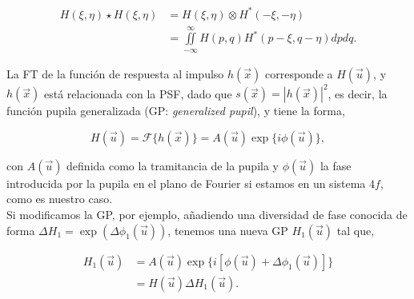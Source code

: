 \begin{equation}
\begin{aligned}
	H(\xi,\eta) \star H(\xi,\eta) &= H(\xi,\eta) \otimes H^{\ast}(-\xi,-\eta) 
	\\&= \iint\limits_{-\infty}^{\infty} H(p,q) H^{\ast}(p-\xi,q-\eta) dp dq.
	\end{aligned}
\end{equation}

La FT de la función de respuesta al impulso $h(\vec{x})$ corresponde a $H(\vec{u})$, y $h(\vec{x})$ está relacionada con la PSF, dado que $s(\vec{x}) = |h(\vec{x})|^2$, es decir, la función pupila generalizada (GP: \textit{generalized pupil}), y tiene la forma,



\begin{equation}
\label{eqD4}
	H(\vec{u}) = \mathscr{F}\{h(\vec{x})\} = A(\vec{u}) \exp\{i \phi(\vec{u})\},
\end{equation}

con $A(\vec{u})$ definida como la tramitancia de la pupila y $\phi(\vec{u})$ la fase introducida por la pupila en el plano de Fourier si estamos en un sistema $4f$, como es nuestro caso.\\ %

Si modificamos la GP, por ejemplo, añadiendo una diversidad de fase conocida de forma $\Delta H_1 = \exp(\Delta \phi_1 (\vec{u}))$, tenemos una nueva GP $H_1(\vec{u})$ tal que,

\begin{equation}
\label{eqD4a}
\begin{aligned}
	H_1(\vec{u}) & = A(\vec{u}) \exp\{i [ \phi(\vec{u}) + \Delta \phi_1(\vec{u})] \}\\
	& = H(\vec{u}) \Delta H_1(\vec{u}).
\end{aligned}
\end{equation}

